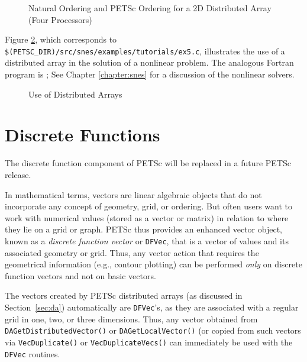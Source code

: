 \begin{figure}[tb]
\centerline{}
\caption{Natural Ordering and PETSc Ordering for a 2D Distributed Array (Four Processors)}
\label{fig:daao}
\end{figure}

Figure \ref{fig:daexample}, which corresponds to
{\tt \$(PETSC\_DIR)/src/snes/examples/tutorials/ex5.c},
illustrates the use of a distributed array in the solution of
a nonlinear problem.  The analogous Fortran program is
;
See Chapter \ref{chapter:snes} for a discussion of the nonlinear
solvers.

\begin{figure}[H]
{\small
{}
}
\caption{Use of Distributed Arrays}
\label{fig:daexample}
\end{figure}

\section{Discrete Functions}

The discrete function component of PETSc will be replaced in a future 
PETSc release.

\medskip \medskip

In mathematical terms, vectors are linear algebraic objects that do
not incorporate any concept of geometry, grid, or ordering.  But often
users want to work with numerical values (stored as a vector or
matrix) in relation to where they lie on a grid or graph. PETSc thus
provides an enhanced vector object, known as a {\em discrete function
vector} or {\tt DFVec}, that is a vector of values and its associated
geometry or grid.  Thus, any vector action that requires the
geometrical information (e.g., contour plotting) can be performed {\em only} on
discrete function vectors and not on basic vectors.

The vectors created by PETSc distributed arrays (as discussed in
Section~\ref{sec:da}) automatically are {\tt DFVec}'s, as they 
are associated with a regular grid in one, two, or three dimensions.  Thus,
any vector obtained from {\tt DAGetDistributedVector()} or
{\tt DAGetLocalVector()} (or copied from such vectors via {\tt VecDuplicate()}
or {\tt VecDuplicateVecs()} can immediately be used with the {\tt DFVec}
routines.

